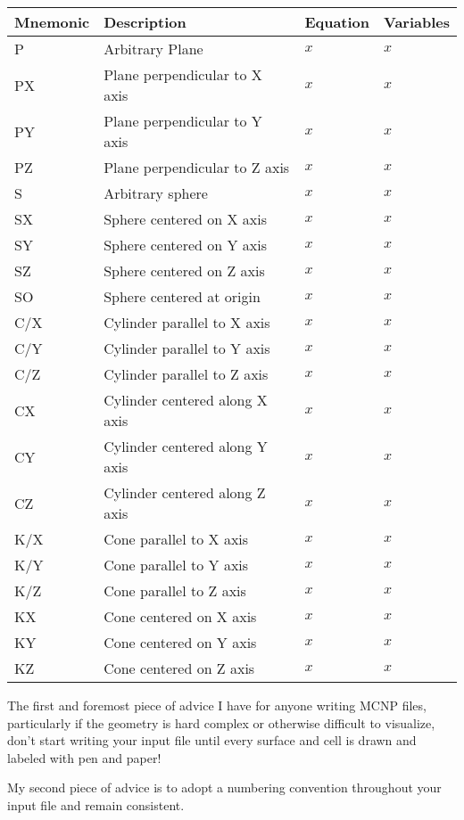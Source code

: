 \documentclass[10pt,a4paper]{book}
\begin{document}
\begin{tabular}{ |l|l|l|l| }
  \hline
  Mnemonic & Description & Equation & Variables  \\ \hline 
  P & Arbitrary Plane & $x$ & $x$ \\
  PX & Plane perpendicular to X axis & $x$ & $x$ \\
  PY & Plane perpendicular to Y axis & $x$ & $x$ \\
  PZ & Plane perpendicular to Z axis & $x$ & $x$ \\ \hline 
  S  & Arbitrary sphere & $x$ & $x$ \\
  SX  & Sphere centered on X axis & $x$ & $x$ \\
  SY  & Sphere centered on Y axis & $x$ & $x$ \\
  SZ  & Sphere centered on Z axis & $x$ & $x$ \\
  SO  & Sphere centered at origin & $x$ & $x$ \\ \hline
  C/X & Cylinder parallel to X axis & $x$ & $x$ \\
  C/Y & Cylinder parallel to Y axis & $x$ & $x$ \\
  C/Z & Cylinder parallel to Z axis & $x$ & $x$ \\
  CX & Cylinder centered along X axis & $x$ & $x$ \\
  CY & Cylinder centered along Y axis & $x$ & $x$ \\
  CZ & Cylinder centered along Z axis & $x$ & $x$ \\ \hline
  K/X & Cone parallel to X axis & $x$ & $x$ \\
  K/Y & Cone parallel to Y axis & $x$ & $x$ \\
  K/Z & Cone parallel to Z axis & $x$ & $x$ \\
  KX & Cone centered on X axis & $x$ & $x$ \\
  KY & Cone centered on Y axis & $x$ & $x$ \\
  KZ & Cone centered on Z axis & $x$ & $x$ \\ \hline
  \hline
\end{tabular}

The first and foremost piece of advice I have for anyone writing MCNP files, particularly if the geometry is hard complex or otherwise difficult to visualize, don't start writing your input file until every surface and cell is drawn and labeled with pen and paper!

My second piece of advice is to adopt a numbering convention throughout your input file and remain consistent.
\end{document}
